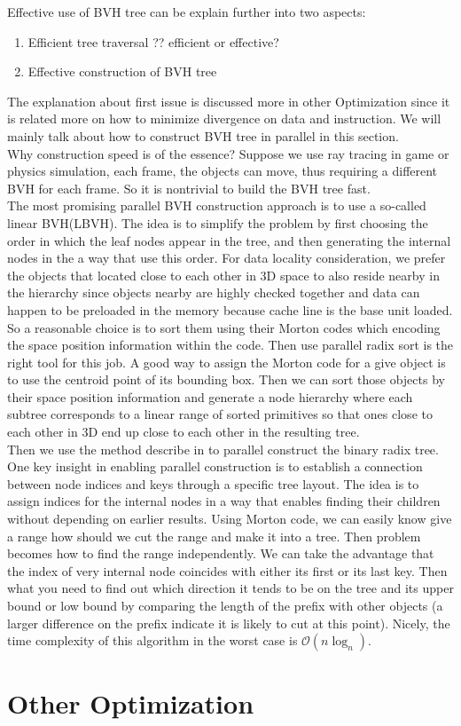 \documentclass[a4paper,10pt]{article}
\begin{document}
Effective use of BVH tree can be explain further into two aspects:
\begin{enumerate}
    \item Efficient tree traversal ?? efficient or effective? 
    \item Effective construction of BVH tree
\end{enumerate}
The explanation about first issue is discussed more in other Optimization since it is related more on how to minimize divergence on data and instruction. We will mainly talk about how to construct BVH tree in parallel in this section. \\
Why construction speed is of the essence? Suppose we use ray tracing in game or physics simulation, each frame, the objects can move, thus requiring a different BVH for each frame. So it is nontrivial to build the BVH tree fast. \\
The most promising parallel BVH construction approach is to use a so-called linear BVH(LBVH). The idea is to simplify the problem by first choosing the order in which the leaf nodes appear in the tree, and then generating the internal nodes in the a way that use this order. For data locality consideration, we prefer the objects that located close to each other in 3D space to also reside nearby in the hierarchy since objects nearby are highly checked together and data can happen to be preloaded in the memory because cache line is the base unit loaded. So a reasonable choice is to sort them using their Morton codes which encoding the space position information within the code. Then use parallel radix sort is the right tool for this job. A good way to assign the Morton code for a give object is to use the centroid point of its bounding box. Then we can sort those objects by their space position information and generate a node hierarchy where each subtree corresponds to a linear range of sorted primitives so that ones close to each other in 3D end up close to each other in the resulting tree. \\
Then we use the method describe in \cite{karras2012maximizing} to parallel construct the binary radix tree. One key insight in enabling parallel construction is to establish a connection between node indices and keys through a specific tree layout. The idea is to assign indices for the internal nodes in a way that enables finding their children without depending on earlier results. Using Morton code, we can easily know give a range how should we cut the range and make it into a tree. Then problem becomes how to find the range independently. We can take the advantage that the index of very internal node coincides with either its first or its last key. Then what you need to find out which direction it tends to be on the tree and its upper bound or low bound by comparing the length of the prefix with other objects (a larger difference on the prefix indicate it is likely to cut at this point). Nicely, the time complexity of this algorithm in the worst case is $\mathcal{O}(n\log_n)$.

\section{Other Optimization}


\medskip


\end{document}
